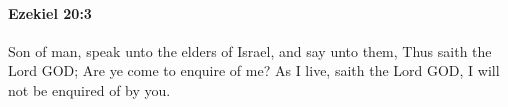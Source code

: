 
		\paragraph{Ezekiel 20:3} %
			\label{EZEKIEL-20-3}

			Son of man, speak unto the elders of Israel, and say unto them, Thus saith the Lord GOD; Are ye come to enquire of me? As I live, saith the Lord GOD, I will not be enquired of by you.


